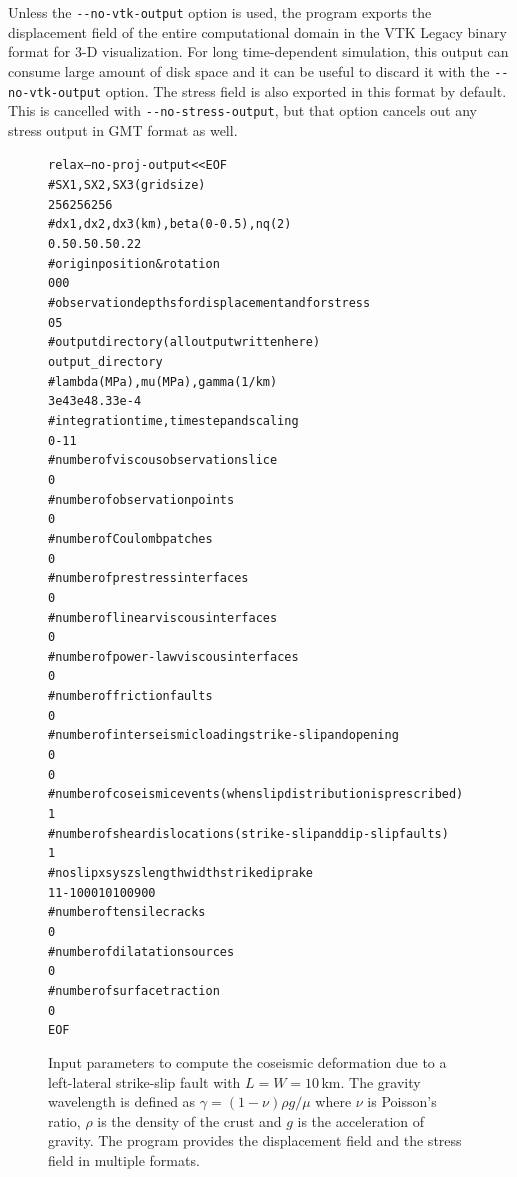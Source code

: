 \documentclass[10pt]{article}
\begin{document}
Unless the \verb'--no-vtk-output' option is used, the program exports the displacement field of the entire computational domain in the VTK Legacy binary format for 3-D visualization. For long time-dependent simulation, this output can consume large amount of disk space and it can be useful to discard it with the \verb'--no-vtk-output' option. The stress field is also exported in this format by default. This is cancelled with \verb'--no-stress-output', but that option cancels out any stress output in GMT format as well.

\begin{figure}
\begin{alltt}
relax --no-proj-output <<EOF
# SX1,SX2,SX3 (grid size)
{\color{orange}256 256 256}
# dx1,dx2,dx3 (km),beta (0-0.5),nq (2)
{\color{orange}0.5 0.5 0.5 0.2} 2
# origin position & rotation
0 0 0
# observation depths for displacement and for stress
{\color{NavyBlue}0 5}
# output directory (all output written here)
output_directory
# lambda (MPa), mu (MPa), gamma (1/km)
{\color{orange}3e4 3e4 8.33e-4}
# integration time, time step and scaling
{\color{orange}0 -1 1}
# number of viscous observation slice
0
# number of observation points
0
# number of Coulomb patches
0
# number of prestress interfaces
0
# number of linear viscous interfaces
0
# number of power-law viscous interfaces
0
# number of friction faults
0
# number of interseismic loading strike-slip and opening
0
0
# number of coseismic events (when slip distribution is prescribed)
1
# number of shear dislocations (strike-slip and dip-slip faults)
1
# no slip  xs ys zs length width strike dip rake
{\color{orange}   1    1 -10  0  0     10    10      0  90    0}
# number of tensile cracks
0
# number of dilatation sources
0
# number of surface traction
0
EOF
\end{alltt}
\caption{Input parameters to compute the coseismic deformation due to a left-lateral strike-slip fault with $L=W=10\,$km. The gravity wavelength is defined as $\gamma=(1-\nu) \rho g/\mu$ where $\nu$ is Poisson's ratio, $\rho$ is the density of the crust and $g$ is the acceleration of gravity. The program provides the displacement field and the stress field in multiple formats.}\label{input:simple_coseismic}
\end{figure}
\end{document}
